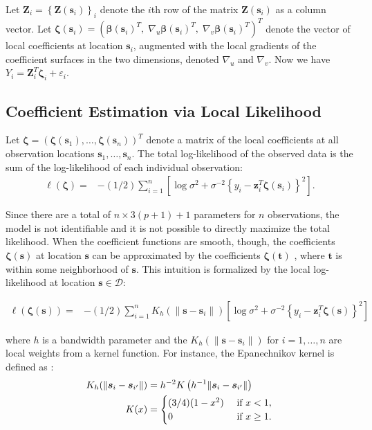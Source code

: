 \documentclass[authoryear,review, 12pt]{elsarticle}
\begin{document}
Let $\bm{Z}_{i}=\left\{ \bm{Z}(\bm{s}_{i})\right\} _{i}$ denote the
$i$th row of the matrix $\bm{Z}(\bm{s}_{i})$ as a column vector.
Let $\bm{\zeta}(\bm{s}_{i})=\left(\bm{\beta}(\bm{s}_{i})^{T},\;\nabla_{u}\bm{\beta}(\bm{s}_{i})^{T},\;\nabla_{v}\bm{\beta}(\bm{s}_{i})^{T}\right)^{T}$
denote the vector of local coefficients at location $\bm{s}_{i}$,
augmented with the local gradients of the coefficient surfaces in
the two dimensions, denoted $\nabla_{u}$ and $\nabla_{v}$. Now we
have $Y_{i}=\bm{Z}_{i}^{T}\bm{\zeta}_{i}+\varepsilon_{i}$.


\subsection{Coefficient Estimation via Local Likelihood}

Let $\bm{\zeta}=\left(\bm{\zeta}(\bm{s}_{1}),\dots,\bm{\zeta}(\bm{s}_{n})\right)^{T}$
denote a matrix of the local coefficients at all observation locations
$\bm{s}_{1},\dots,\bm{s}_{n}$. The total log-likelihood of the observed
data is the sum of the log-likelihood of each individual observation:
\begin{align}
\ell\left(\bm{\zeta}\right)= & -(1/2)\sum_{i=1}^{n}\left[\log{\sigma^{2}}+\sigma^{-2}\left\{ y_{i}-\bm{z}_{i}^{T}\bm{\zeta}(\bm{s}_{i})\right\} ^{2}\right].\label{eq:coefficients}
\end{align}


Since there are a total of $n\times3(p+1)+1$ parameters for $n$
observations, the model is not identifiable and it is not possible
to directly maximize the total likelihood. When the coefficient functions
are smooth, though, the coefficients $\bm{\zeta}(\bm{s})$ at location
$\bm{s}$ can be approximated by the coefficients $\bm{\zeta}(\bm{t})$
, where $\bm{t}$ is within some neighborhood of $\bm{s}$. This intuition
is formalized by the local log-likelihood at location $\bm{s}\in\mathcal{D}$:

\begin{align}
\ell\left(\bm{\zeta}(\bm{s})\right)= & -(1/2)\sum_{i=1}^{n}K_{h}(\|\bm{s}-\bm{s}_{i}\|)\left[\log\sigma^{2}+\sigma^{-2}\left\{ y_{i}-\bm{z}_{i}^{T}\bm{\zeta}(\bm{s})\right\} ^{2}\right]\label{eq:local-log-likelihood}
\end{align}


where $h$ is a bandwidth parameter and the $K_{h}(\|\bm{s}-\bm{s}_{i}\|)$
for $i=1,\dots,n$ are local weights from a kernel function. For instance,
the Epanechnikov kernel is defined as \citep{Samiuddin-el-Sayyad-1990}:
\begin{align}
K_{h}(\|\bm{s}_{i}-\bm{s}_{i'}\|) & =h^{-2}K\left(h^{-1}\|\bm{s}_{i}-\bm{s}_{i'}\|\right)\notag\label{eq:epanechnikov}\\
K(x) & =\begin{cases}
(3/4)(1-x^{2}) & \mbox{ if }x<1,\\
0 & \mbox{ if }x\geq1.
\end{cases}
\end{align}
\end{document}
